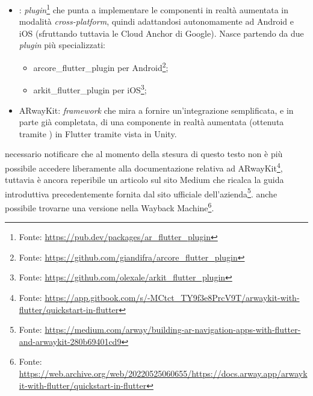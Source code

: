 \begin{itemize}
    \item \aplug{}: \textit{plugin}\footnote{Fonte: \url{https://pub.dev/packages/ar_flutter_plugin}} che punta a implementare le componenti in realtà aumentata in modalità \textit{cross-platform}, quindi adattandosi autonomamente ad Android e iOS (sfruttando tuttavia le Cloud Anchor di Google). Nasce partendo da due \textit{plugin} più specializzati: 
    \begin{itemize}
        \item arcore\_flutter\_plugin per Android\footnote{Fonte: \url{https://github.com/giandifra/arcore_flutter_plugin}};
        \item arkit\_flutter\_plugin per iOS\footnote{Fonte: \url{https://github.com/olexale/arkit_flutter_plugin}};
    \end{itemize}
    \item ARwayKit: \textit{framework} che mira a fornire un'integrazione semplificata, e in parte già completata, di una componente in realtà aumentata (ottenuta tramite \asa{}) in Flutter tramite vista in Unity.
\end{itemize}

\e necessario notificare che al momento della stesura di questo testo non è più possibile accedere liberamente alla documentazione relativa ad ARwayKit\footnote{Fonte: \url{https://app.gitbook.com/s/-MCtct_TY9f3e8PrcV9T/arwaykit-with-flutter/quickstart-in-flutter}}, tuttavia è ancora reperibile un articolo sul sito Medium che ricalca la guida introduttiva precedentemente fornita dal sito ufficiale dell'azienda\footnote{Fonte: \url{https://medium.com/arway/building-ar-navigation-apps-with-flutter-and-arwaykit-280b69401cd9}}. 
\e anche possibile trovarne una versione nella Wayback Machine\footnote{Fonte: \url{https://web.archive.org/web/20220525060655/https://docs.arway.app/arwaykit-with-flutter/quickstart-in-flutter}}.

